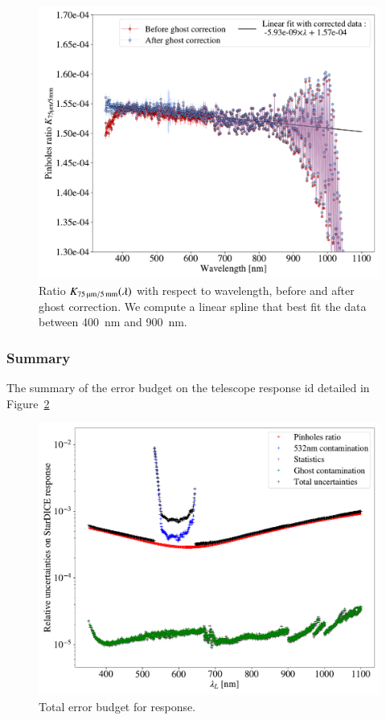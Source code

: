 \begin{figure}[h]
    \centering
    \includegraphics[width=\columnwidth]{fig/ratio_pinholes.pdf}
    \caption{Ratio $K_\mathrm{\SI{75}{\micro\meter}/\SI{5}{\milli\meter}}(\lambda)$ with respect to wavelength, before and after ghost correction. We compute a linear spline that best fit the data between \SI{400}{\nm} and \SI{900}{\nm}.}
    \label{fig:ratio_pinholes}
\end{figure}

\subsubsection{Summary}

The summary of the error budget on the \SD telescope response id detailed in Figure~\ref{fig:sd_budget}


\begin{figure}
    \centering
    \includegraphics[width=\columnwidth]{fig/sd_uncertainties_budget.pdf}
    \caption{Total error budget for \SD response.}
    \label{fig:sd_budget}
\end{figure}

